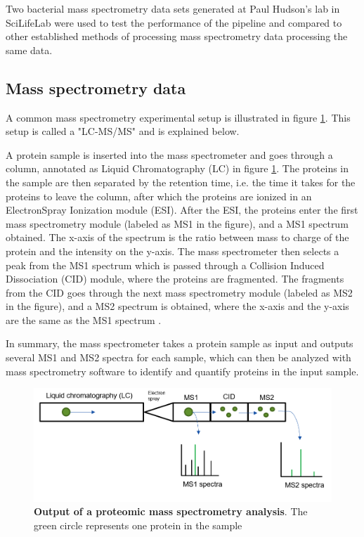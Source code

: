 Two bacterial mass spectrometry data sets generated at Paul Hudson's lab in SciLifeLab were used to test the performance of the pipeline and compared to other established methods of processing mass spectrometry data processing the same data.

\subsection{Mass spectrometry data}

A common mass spectrometry experimental setup is illustrated in figure \ref{fig:mass-spec}. This setup is called a "LC-MS/MS" and is explained below.

A protein sample is inserted into the mass spectrometer and goes through a column, annotated as Liquid Chromatography (LC) in figure \ref{fig:mass-spec}. The proteins in the sample are then separated by the retention time, i.e. the time it takes for the proteins to leave the column, after which the proteins are ionized in an ElectronSpray Ionization module (ESI). After the ESI, the proteins enter the first mass spectrometry module (labeled as MS1 in the figure), and a MS1 spectrum obtained. The x-axis of the spectrum is the ratio between mass to charge of the protein and the intensity on the y-axis. The mass spectrometer then selects a peak from the MS1 spectrum which is passed through a Collision Induced Dissociation (CID) module, where the proteins are fragmented. The fragments from the CID goes through the next mass spectrometry module (labeled as MS2 in the figure), and a MS2 spectrum is obtained, where the x-axis and the y-axis are the same as the MS1 spectrum \cite{quantitative_analysis}.

In summary, the mass spectrometer takes a protein sample as input and outputs several MS1 and MS2 spectra for each sample, which can then be analyzed with mass spectrometry software to identify and quantify proteins in the input sample.

\begin{figure}[H]
  \includegraphics[width=\linewidth]{pictures/mass_spec.png}
  \caption{\textbf{Output of a proteomic mass spectrometry analysis}. The green circle represents one protein in the sample}
  \label{fig:mass-spec}
\end{figure}

